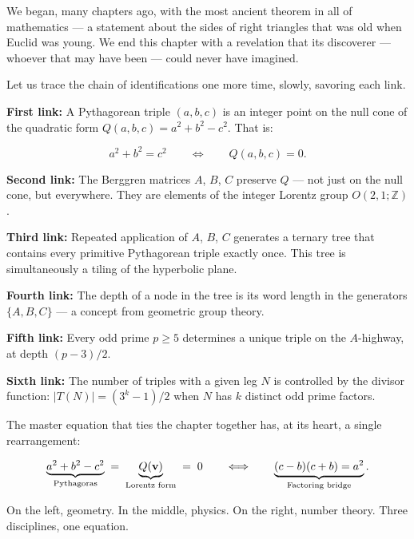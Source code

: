 \documentclass[11pt,openany]{book}
\theoremstyle{definition}
\theoremstyle{plain}
\theoremstyle{remark}
\begin{document}
We began, many chapters ago, with the most ancient theorem in all of mathematics — a statement about the sides of right triangles that was old when Euclid was young. We end this chapter with a revelation that its discoverer — whoever that may have been — could never have imagined.

Let us trace the chain of identifications one more time, slowly, savoring each link.

\textbf{First link:} A Pythagorean triple $(a, b, c)$ is an integer point on the null cone of the quadratic form $Q(a, b, c) = a^2 + b^2 - c^2$. That is:

$$a^2 + b^2 = c^2 \qquad\Longleftrightarrow\qquad Q(a, b, c) = 0.$$

\textbf{Second link:} The Berggren matrices $A$, $B$, $C$ preserve $Q$ — not just on the null cone, but everywhere. They are elements of the integer Lorentz group $O(2,1; \mathbb{Z})$.

\textbf{Third link:} Repeated application of $A$, $B$, $C$ generates a ternary tree that contains every primitive Pythagorean triple exactly once. This tree is simultaneously a tiling of the hyperbolic plane.

\textbf{Fourth link:} The depth of a node in the tree is its word length in the generators $\{A, B, C\}$ — a concept from geometric group theory.

\textbf{Fifth link:} Every odd prime $p \geq 5$ determines a unique triple on the $A$-highway, at depth $(p - 3)/2$.

\textbf{Sixth link:} The number of triples with a given leg $N$ is controlled by the divisor function: $|T(N)| = (3^k - 1)/2$ when $N$ has $k$ distinct odd prime factors.

The master equation that ties the chapter together has, at its heart, a single rearrangement:

$$\underbrace{a^2 + b^2 - c^2}_{\text{Pythagoras}} \;=\; \underbrace{Q(\mathbf{v})}_{\text{Lorentz form\index{Lorentz form}}} \;=\; 0 \qquad\Longleftrightarrow\qquad \underbrace{(c - b)(c + b) = a^2}_{\text{Factoring\index{factoring} bridge}}.$$

On the left, geometry. In the middle, physics. On the right, number theory. Three disciplines, one equation.
\end{document}
